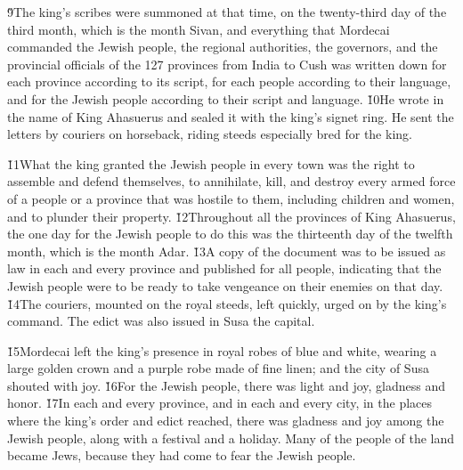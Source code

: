 \v{9}The king's scribes were summoned at that time, on the twenty-third day of the third month, which is the month Sivan, and everything that Mordecai commanded the Jewish people, the regional authorities, the governors, and the provincial officials of the 127 provinces from India to Cush was written down for each province according to its script, for each people according to their language, and for the Jewish people according to their script and language. \v{10}He wrote in the name of King Ahasuerus and sealed it with the king's signet ring. He sent the letters by couriers on horseback, riding steeds especially bred for the king.

\v{11}What the king granted the Jewish people in every town was the right to assemble and defend themselves, to annihilate, kill, and destroy every armed force of a people or a province that was hostile to them, including children and women, and to plunder their property. \v{12}Throughout all the provinces of King Ahasuerus, the one day for the Jewish people to do this was the thirteenth day of the twelfth month, which is the month Adar. \v{13}A copy of the document was to be issued as law in each and every province and published for all people, indicating that the Jewish people were to be ready to take vengeance on their enemies on that day. \v{14}The couriers, mounted on the royal steeds, left quickly, urged on by the king's command. The edict was also issued in Susa the capital.

\v{15}Mordecai left the king's presence in royal robes of blue and white, wearing a large golden crown and a purple robe made of fine linen; and the city of Susa shouted with joy. \v{16}For the Jewish people, there was light and joy, gladness and honor. \v{17}In each and every province, and in each and every city, in the places where the king's order and edict reached, there was gladness and joy among the Jewish people, along with a festival and a holiday. Many of the people of the land became Jews, because they had come to fear the Jewish people.


